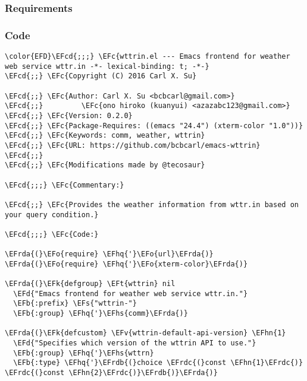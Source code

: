 \documentclass[a4wide,10pt]{article}
\newcommand{\EFc}[1]{\textcolor{EFc}{#1}} %
\newcommand{\EFcd}[1]{\textcolor{EFcd}{#1}} %
\newcommand{\EFs}[1]{\textcolor{EFs}{#1}} %
\newcommand{\EFd}[1]{\textcolor{EFd}{#1}} %
\newcommand{\EFk}[1]{\textcolor{EFk}{#1}} %
\newcommand{\EFb}[1]{\textcolor{EFb}{#1}} %
\newcommand{\EFv}[1]{\textcolor{EFv}{#1}} %
\newcommand{\EFt}[1]{\textcolor{EFt}{#1}} %
\newcommand{\EFo}[1]{\textcolor{EFo}{#1}} %
\newcommand{\EFhn}[1]{\textcolor{EFhn}{\textbf{#1}}} %
\newcommand{\EFhq}[1]{\textcolor{EFhq}{#1}} %
\newcommand{\EFhs}[1]{\textcolor{EFhs}{#1}} %
\newcommand{\EFrda}[1]{\textcolor{EFrda}{#1}} %
\newcommand{\EFrdb}[1]{\textcolor{EFrdb}{#1}} %
\newcommand{\EFrdc}[1]{\textcolor{EFrdc}{#1}} %
\begin{document}
\subsubsection{Requirements}
\label{sec:org197fa37}
\subsubsection{Code}
\label{sec:org7f189c0}
\begin{Code}
\begin{Verbatim}
\color{EFD}\EFcd{;;;} \EFc{wttrin.el --- Emacs frontend for weather web service wttr.in -*- lexical-binding: t; -*-}
\EFcd{;;} \EFc{Copyright (C) 2016 Carl X. Su}

\EFcd{;;} \EFc{Author: Carl X. Su <bcbcarl@gmail.com>}
\EFcd{;;}         \EFc{ono hiroko (kuanyui) <azazabc123@gmail.com>}
\EFcd{;;} \EFc{Version: 0.2.0}
\EFcd{;;} \EFc{Package-Requires: ((emacs "24.4") (xterm-color "1.0"))}
\EFcd{;;} \EFc{Keywords: comm, weather, wttrin}
\EFcd{;;} \EFc{URL: https://github.com/bcbcarl/emacs-wttrin}
\EFcd{;;}
\EFcd{;;} \EFc{Modifications made by @tecosaur}

\EFcd{;;;} \EFc{Commentary:}

\EFcd{;;} \EFc{Provides the weather information from wttr.in based on your query condition.}

\EFcd{;;;} \EFc{Code:}

\EFrda{(}\EFo{require} \EFhq{'}\EFo{url}\EFrda{)}
\EFrda{(}\EFo{require} \EFhq{'}\EFo{xterm-color}\EFrda{)}

\EFrda{(}\EFk{defgroup} \EFt{wttrin} nil
  \EFd{"Emacs frontend for weather web service wttr.in."}
  \EFb{:prefix} \EFs{"wttrin-"}
  \EFb{:group} \EFhq{'}\EFhs{comm}\EFrda{)}

\EFrda{(}\EFk{defcustom} \EFv{wttrin-default-api-version} \EFhn{1}
  \EFd{"Specifies which version of the wttrin API to use."}
  \EFb{:group} \EFhq{'}\EFhs{wttrn}
  \EFb{:type} \EFhq{'}\EFrdb{(}choice \EFrdc{(}const \EFhn{1}\EFrdc{)} \EFrdc{(}const \EFhn{2}\EFrdc{)}\EFrdb{)}\EFrda{)}


\end{Verbatim}
\end{Code}
\end{document}
